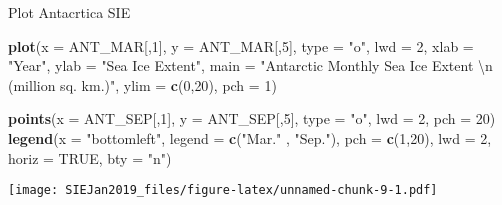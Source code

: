 \documentclass[]{article}
\newenvironment{Shaded}{\begin{snugshade}}{\end{snugshade}}
\newcommand{\KeywordTok}[1]{\textcolor[rgb]{0.13,0.29,0.53}{\textbf{#1}}}
\newcommand{\DataTypeTok}[1]{\textcolor[rgb]{0.13,0.29,0.53}{#1}}
\newcommand{\DecValTok}[1]{\textcolor[rgb]{0.00,0.00,0.81}{#1}}
\newcommand{\CharTok}[1]{\textcolor[rgb]{0.31,0.60,0.02}{#1}}
\newcommand{\StringTok}[1]{\textcolor[rgb]{0.31,0.60,0.02}{#1}}
\newcommand{\OtherTok}[1]{\textcolor[rgb]{0.56,0.35,0.01}{#1}}
\newcommand{\NormalTok}[1]{#1}
\begin{document}
Plot Antacrtica SIE

\begin{Shaded}
\begin{Highlighting}[]
\KeywordTok{plot}\NormalTok{(}\DataTypeTok{x =}\NormalTok{ ANT_MAR[,}\DecValTok{1}\NormalTok{], }\DataTypeTok{y =}\NormalTok{ ANT_MAR[,}\DecValTok{5}\NormalTok{], }\DataTypeTok{type =} \StringTok{"o"}\NormalTok{, }\DataTypeTok{lwd =} \DecValTok{2}\NormalTok{, }\DataTypeTok{xlab =} \StringTok{"Year"}\NormalTok{, }\DataTypeTok{ylab =} \StringTok{"Sea Ice Extent"}\NormalTok{, }\DataTypeTok{main =} \StringTok{"Antarctic Monthly Sea Ice Extent }\CharTok{\textbackslash{}n}\StringTok{ (million sq. km.)"}\NormalTok{, }\DataTypeTok{ylim =} \KeywordTok{c}\NormalTok{(}\DecValTok{0}\NormalTok{,}\DecValTok{20}\NormalTok{), }\DataTypeTok{pch =} \DecValTok{1}\NormalTok{)}

\KeywordTok{points}\NormalTok{(}\DataTypeTok{x =}\NormalTok{ ANT_SEP[,}\DecValTok{1}\NormalTok{], }\DataTypeTok{y =}\NormalTok{ ANT_SEP[,}\DecValTok{5}\NormalTok{], }\DataTypeTok{type =} \StringTok{"o"}\NormalTok{, }\DataTypeTok{lwd =} \DecValTok{2}\NormalTok{, }\DataTypeTok{pch =} \DecValTok{20}\NormalTok{)}
\KeywordTok{legend}\NormalTok{(}\DataTypeTok{x =} \StringTok{"bottomleft"}\NormalTok{, }\DataTypeTok{legend =} \KeywordTok{c}\NormalTok{(}\StringTok{"Mar."}\NormalTok{ , }\StringTok{"Sep."}\NormalTok{), }\DataTypeTok{pch =} \KeywordTok{c}\NormalTok{(}\DecValTok{1}\NormalTok{,}\DecValTok{20}\NormalTok{), }\DataTypeTok{lwd =} \DecValTok{2}\NormalTok{, }\DataTypeTok{horiz =} \OtherTok{TRUE}\NormalTok{, }\DataTypeTok{bty =} \StringTok{"n"}\NormalTok{)}
\end{Highlighting}
\end{Shaded}

\texttt{[image: SIEJan2019\_files/figure-latex/unnamed-chunk-9-1.pdf]}
\end{document}
